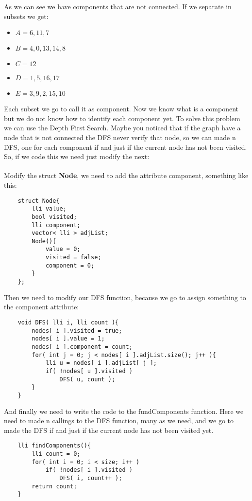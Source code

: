 As we can see we have components that are not connected. If we separate in subsets we get:
\begin{itemize}
    \item { $A = { 6, 11, 7 }$ }
    \item { $B = { 4, 0, 13, 14, 8 }$ }
    \item { $C = { 12 }$ }
    \item { $D = { 1, 5, 16, 17 }$ }
    \item { $E = { 3, 9, 2, 15, 10 }$ }
\end{itemize}

Each subset we go to call it as component. Now we know what is a component but we do not know how to identify each component yet. To solve this problem we can use the Depth First Search. Maybe you noticed that if the graph have a node that is not connected the DFS never verify that node, so we can made n DFS, one for each component if and just if the current node has not been visited.
So, if we code this we need just modify the next:\\\\

Modify the struct \textbf{Node}, we need to add the attribute component, something like this:
\begin{lstlisting}
    struct Node{
        lli value;
        bool visited;
        lli component;
        vector< lli > adjList;
        Node(){
            value = 0;
            visited = false;
            component = 0;
        }        
    };
\end{lstlisting}

Then we need to modify our DFS function, because we go to assign something to the component attribute:

\begin{lstlisting}
    void DFS( lli i, lli count ){
        nodes[ i ].visited = true;
        nodes[ i ].value = 1;
        nodes[ i ].component = count;
        for( int j = 0; j < nodes[ i ].adjList.size(); j++ ){
            lli u = nodes[ i ].adjList[ j ];
            if( !nodes[ u ].visited )
                DFS( u, count );
        }
    }
\end{lstlisting}

And finally we need to write the code to the fundComponents function. Here we need to made n callings to the DFS function, many as we need, and we go to made the DFS if and just if the current node has not been visited yet.

\begin{lstlisting}
    lli findComponents(){
        lli count = 0;
        for( int i = 0; i < size; i++ )
            if( !nodes[ i ].visited )
                DFS( i, count++ );
        return count;
    }
\end{lstlisting}